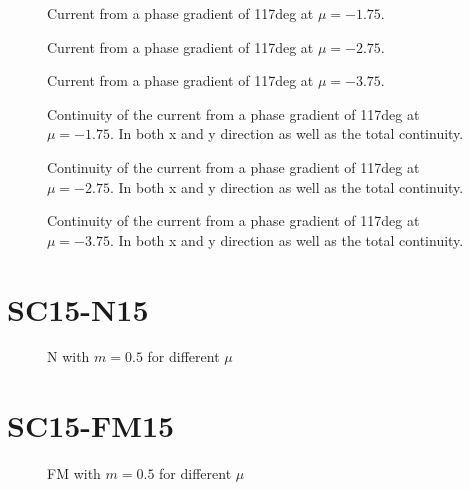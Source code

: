 \documentclass[../main.tex]{subfiles}
\begin{document}
\begin{figure}[H]
    
    \caption{Current from a phase gradient of 117deg at $\mu = -1.75$.}
\end{figure}
\begin{figure}[H]
    
    \caption{Current from a phase gradient of 117deg at $\mu = -2.75$.}
\end{figure}
\begin{figure}[H]
    
    \caption{Current from a phase gradient of 117deg at $\mu = -3.75$.}
\end{figure}
\begin{figure}[H]
    
    \caption{Continuity of the current from a phase gradient of 117deg at $\mu = -1.75$. In both x and y direction as
    well as the total continuity.}
\end{figure}
\begin{figure}[H]
    
    \caption{Continuity of the current from a phase gradient of 117deg at $\mu = -2.75$. In both x and y direction as
    well as the total continuity.}
\end{figure}
\begin{figure}[H]
    
    \caption{Continuity of the current from a phase gradient of 117deg at $\mu = -3.75$. In both x and y direction as
    well as the total continuity.}
\end{figure}

\section{SC15-N15}
\begin{figure}[H]
    
    \caption{N with $m=0.5$ for different $\mu$}
\end{figure}
\section{SC15-FM15}
\begin{figure}[H]
    
    \caption{FM with $m=0.5$ for different $\mu$}
\end{figure}
\end{document}
